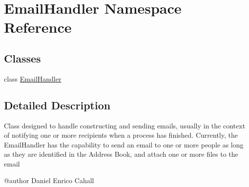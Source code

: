 \hypertarget{namespaceEmailHandler}{}\section{Email\+Handler Namespace Reference}
\label{namespaceEmailHandler}
\subsection*{Classes}
\begin{DoxyCompactItemize}
\item 
class \mbox{\hyperlink{classEmailHandler_1_1EmailHandler}{Email\+Handler}}
\end{DoxyCompactItemize}


\subsection{Detailed Description}
\begin{DoxyVerb}Class designed to handle constructing and sending emails, usually in the context of notifying one
or more recipients when a process has finished. Currently, the EmailHandler has the capability
to send an email to one or more people as long as they are identified in the Address Book,
and attach one or more files to the email

@author Daniel Enrico Cahall
\end{DoxyVerb}
 
